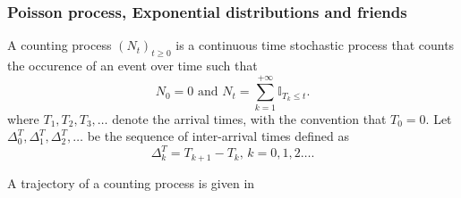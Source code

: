 \subsubsection{Poisson process, Exponential distributions and friends}\label{sssec:exp_distribution}
\begin{definition}\label{def:counting_process}
A counting process $(N_t)_{t\geq0}$ is a continuous time stochastic process that counts the occurence of an event over time such that
\begin{equation*}
N_0=0\text{ and }N_t=\sum_{k=1}^{+\infty}\mathbb{I}_{T_k\leq t}.
\end{equation*}
where $T_1,T_2,T_3,\ldots$ denote the arrival times, with the convention that $T_0=0$. Let $\Delta^T_0,\Delta^T_1,\Delta^T_2,\ldots$ be the sequence of inter-arrival times defined as
$$
\Delta^T_k=T_{k+1}-T_{k}\text{, }k=0,1,2\ldots.
$$
\end{definition}
A trajectory of a counting process is given in 
